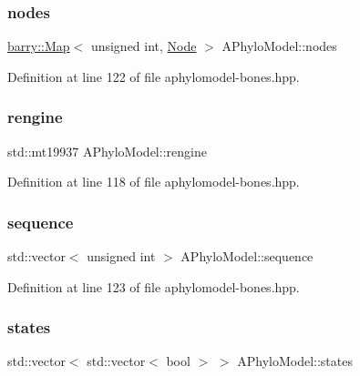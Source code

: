 \subsubsection{\texorpdfstring{nodes}{nodes}}
{\footnotesize\ttfamily \hyperlink{namespacebarry_a979a04835a9855ff2054c383c569c89e}{barry\+::\+Map}$<$ unsigned int, \hyperlink{class_node}{Node} $>$ A\+Phylo\+Model\+::nodes}



Definition at line 122 of file aphylomodel-\/bones.\+hpp.

\mbox{\label{class_a_phylo_model_a3f7a406330ca376840dcea3324e69448}} 
\subsubsection{\texorpdfstring{rengine}{rengine}}
{\footnotesize\ttfamily std\+::mt19937 A\+Phylo\+Model\+::rengine}



Definition at line 118 of file aphylomodel-\/bones.\+hpp.

\mbox{\label{class_a_phylo_model_a5f15ec301385244387c9be5290f5ee28}} 
\subsubsection{\texorpdfstring{sequence}{sequence}}
{\footnotesize\ttfamily std\+::vector$<$ unsigned int $>$ A\+Phylo\+Model\+::sequence}



Definition at line 123 of file aphylomodel-\/bones.\+hpp.

\mbox{\label{class_a_phylo_model_aa6a0a51491c065588bb3504d9b84540c}} 
\subsubsection{\texorpdfstring{states}{states}}
{\footnotesize\ttfamily std\+::vector$<$ std\+::vector$<$ bool $>$ $>$ A\+Phylo\+Model\+::states}



